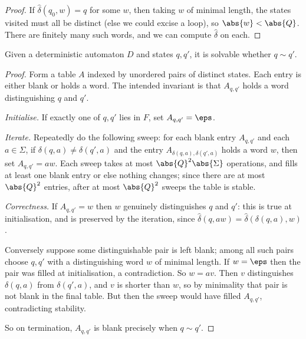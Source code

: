 \begin{proof}
	If $\hat\delta(q_0,w) = q$ for some $w$, then taking $w$ of minimal length, the states visited must all be distinct (else we could excise a loop), so $\abs{w} < \abs{Q}$. There are finitely many such words, and we can compute $\hat\delta$ on each.
\end{proof}

\begin{theorem}\label{thm:tablefilling}
	Given a deterministic automaton $D$ and states $q,q'$, it is solvable whether $q \sim q'$.
\end{theorem}

\begin{proof}
	Form a table $A$ indexed by unordered pairs of distinct states. Each entry is either blank or holds a word. The intended invariant is that $A_{q,q'}$ holds a word distinguishing $q$ and $q'$.

	\emph{Initialise.} If exactly one of $q,q'$ lies in $F$, set $A_{q,q'} = \eps$.

	\emph{Iterate.} Repeatedly do the following sweep: for each blank entry $A_{q,q'}$ and each $a \in \Sigma$, if $\delta(q,a) \neq \delta(q',a)$ and the entry $A_{\delta(q,a),\delta(q',a)}$ holds a word $w$, then set $A_{q,q'} = aw$. Each sweep takes at most $\abs{Q}^2\abs{\Sigma}$ operations, and fills at least one blank entry or else nothing changes; since there are at most $\abs{Q}^2$ entries, after at most $\abs{Q}^2$ sweeps the table is stable.

	\emph{Correctness.} If $A_{q,q'} = w$ then $w$ genuinely distinguishes $q$ and $q'$: this is true at initialisation, and is preserved by the iteration, since $\hat\delta(q,aw) = \hat\delta(\delta(q,a),w)$.

	Conversely suppose some distinguishable pair is left blank; among all such pairs choose $q,q'$ with a distinguishing word $w$ of minimal length. If $w = \eps$ then the pair was filled at initialisation, a contradiction. So $w = av$. Then $v$ distinguishes $\delta(q,a)$ from $\delta(q',a)$, and $v$ is shorter than $w$, so by minimality that pair is not blank in the final table. But then the sweep would have filled $A_{q,q'}$, contradicting stability.

	So on termination, $A_{q,q'}$ is blank precisely when $q \sim q'$.
\end{proof}

